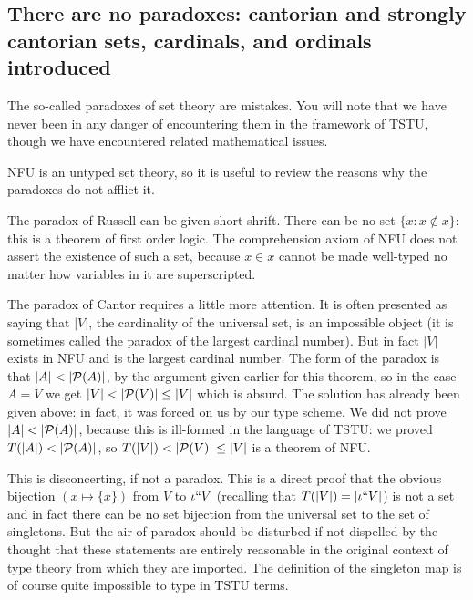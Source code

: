 \documentclass[12pt]{article}
\begin{document}
\subsection{There are no paradoxes:  cantorian and strongly cantorian sets, cardinals, and ordinals introduced}

The so-called paradoxes of set theory are mistakes.  You will note that we have never been in any danger of encountering them in the framework of TSTU, though we have encountered related mathematical issues.

NFU is an untyped set theory, so it is useful to review the reasons why the paradoxes do not afflict it.

The paradox of Russell can be given short shrift.  There can be no set $\{x : x \not\in x\}$:  this is a theorem of first order logic.  The comprehension axiom of NFU does not assert the existence of such a set, because
$x \in x$ cannot be made well-typed no matter how variables in it are superscripted.

The paradox of Cantor requires a little more attention.  It is often presented as saying that $|V|$, the cardinality of the universal set, is an impossible object (it is sometimes called the paradox of the largest cardinal number).  But in fact $|V|$ exists in NFU and is the largest cardinal number.  The form of the paradox
is that $|A| < |{\cal P}(A)|$, by the argument given earlier for this theorem, so in the case $A=V$ we get $|V| < |{\cal P}(V)| \leq |V|$ which is absurd.  The solution has already been given above:  in fact, it was forced on us
by our type scheme.  We did not prove $|A| < |{\cal P}(A)|$, because this is ill-formed in the language of TSTU:  we proved $T(|A|) < |{\cal P}(A)|$, so $T(|V|) < |{\cal P}(V)| \leq |V|$ is a theorem of NFU.

This is disconcerting, if not a paradox.  This is a direct proof that the obvious bijection $(x \mapsto \{x\})$ from $V$ to $\iota``V$ (recalling that $T(|V|) = |\iota``V|$) is not a set and in fact there can be no set bijection
from the universal set to the set of singletons.  But the air of paradox should be disturbed if not dispelled by the thought that these statements are entirely reasonable in the original context of type theory from which they are imported.  The definition of the singleton map is of course quite impossible to type in TSTU terms.
\end{document}
